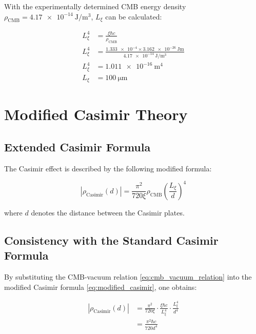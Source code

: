 	With the experimentally determined CMB energy density \( \rho_{\text{CMB}} = \SI{4.17e-14}{\joule\per\meter^3} \), \( L_\xi \) can be calculated:
	
	\begin{align}
		L_\xi^4 &= \frac{\xi \hbar c}{\rho_{\text{CMB}}} \label{eq:Lxi_calculation}\\
		L_\xi^4 &= \frac{\num{1.333e-4} \times \SI{3.162e-26}{\joule\meter}}{\SI{4.17e-14}{\joule\per\meter^3}}\\
		L_\xi^4 &= \SI{1.011e-16}{\meter^4}\\
		L_\xi &= \SI{100}{\micro\meter} \label{eq:Lxi_result}
	\end{align}
	
	\section{Modified Casimir Theory}
	
	\subsection{Extended Casimir Formula}
	
	The Casimir effect is described by the following modified formula:
	
	\begin{equation}
		|\rho_{\text{Casimir}}(d)| = \frac{\pi^2}{720\xi} \rho_{\text{CMB}} \left( \frac{L_\xi}{d} \right)^4 \label{eq:modified_casimir}
	\end{equation}
	
	
	
	where \( d \) denotes the distance between the Casimir plates.
	
	\subsection{Consistency with the Standard Casimir Formula}
	
	By substituting the CMB-vacuum relation \eqref{eq:cmb_vacuum_relation} into the modified Casimir formula \eqref{eq:modified_casimir}, one obtains:
	
	\begin{align}
		|\rho_{\text{Casimir}}(d)| &= \frac{\pi^2}{720\xi} \cdot \frac{\xi \hbar c}{L_\xi^4} \cdot \frac{L_\xi^4}{d^4} \label{eq:casimir_substitution}\\
		&= \frac{\pi^2 \hbar c}{720 d^4} \label{eq:standard_casimir_recovered}
	\end{align}
	
